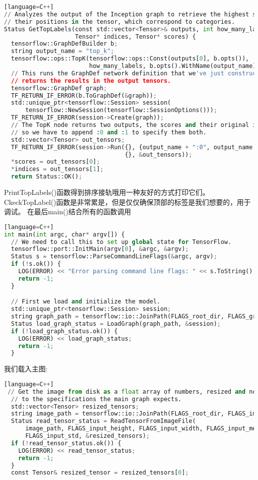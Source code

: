 \begin{lstlisting}[language=Python][language=C++]
// Analyzes the output of the Inception graph to retrieve the highest scores and
// their positions in the tensor, which correspond to categories.
Status GetTopLabels(const std::vector<Tensor>& outputs, int how_many_labels,
                    Tensor* indices, Tensor* scores) {
  tensorflow::GraphDefBuilder b;
  string output_name = "top_k";
  tensorflow::ops::TopK(tensorflow::ops::Const(outputs[0], b.opts()),
                        how_many_labels, b.opts().WithName(output_name));
  // This runs the GraphDef network definition that we've just constructed, and
  // returns the results in the output tensors.
  tensorflow::GraphDef graph;
  TF_RETURN_IF_ERROR(b.ToGraphDef(&graph));
  std::unique_ptr<tensorflow::Session> session(
      tensorflow::NewSession(tensorflow::SessionOptions()));
  TF_RETURN_IF_ERROR(session->Create(graph));
  // The TopK node returns two outputs, the scores and their original indices,
  // so we have to append :0 and :1 to specify them both.
  std::vector<Tensor> out_tensors;
  TF_RETURN_IF_ERROR(session->Run({}, {output_name + ":0", output_name + ":1"},
                                  {}, &out_tensors));
  *scores = out_tensors[0];
  *indices = out_tensors[1];
  return Status::OK();
\end{lstlisting}
PrintTopLabels()函数得到排序接轨哦用一种友好的方式打印它们。CkeckTopLabel()函数是非常累是，但是仅仅确保顶部的标签是我们想要的，用于调试。
在最后main()结合所有的函数调用
\begin{lstlisting}[language=Python][language=C++]
int main(int argc, char* argv[]) {
  // We need to call this to set up global state for TensorFlow.
  tensorflow::port::InitMain(argv[0], &argc, &argv);
  Status s = tensorflow::ParseCommandLineFlags(&argc, argv);
  if (!s.ok()) {
    LOG(ERROR) << "Error parsing command line flags: " << s.ToString();
    return -1;
  }

  // First we load and initialize the model.
  std::unique_ptr<tensorflow::Session> session;
  string graph_path = tensorflow::io::JoinPath(FLAGS_root_dir, FLAGS_graph);
  Status load_graph_status = LoadGraph(graph_path, &session);
  if (!load_graph_status.ok()) {
    LOG(ERROR) << load_graph_status;
    return -1;
  }
\end{lstlisting}
我们载入主图:
\begin{lstlisting}[language=Python][language=C++]
 // Get the image from disk as a float array of numbers, resized and normalized
  // to the specifications the main graph expects.
  std::vector<Tensor> resized_tensors;
  string image_path = tensorflow::io::JoinPath(FLAGS_root_dir, FLAGS_image);
  Status read_tensor_status = ReadTensorFromImageFile(
      image_path, FLAGS_input_height, FLAGS_input_width, FLAGS_input_mean,
      FLAGS_input_std, &resized_tensors);
  if (!read_tensor_status.ok()) {
    LOG(ERROR) << read_tensor_status;
    return -1;
  }
  const Tensor& resized_tensor = resized_tensors[0];
\end{lstlisting}
